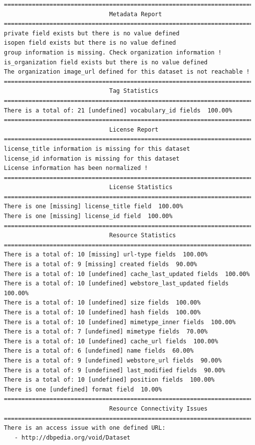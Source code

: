 \documentclass[runningheads,a4paper]{llncs}
\begin{document}
\begin{lstlisting}
=======================================================================
                              Metadata Report
=======================================================================
private field exists but there is no value defined
isopen field exists but there is no value defined
group information is missing. Check organization information !
is_organization field exists but there is no value defined
The organization image_url defined for this dataset is not reachable !
=======================================================================
                              Tag Statistics
=======================================================================
There is a total of: 21 [undefined] vocabulary_id fields  100.00%
=======================================================================
                              License Report
=======================================================================
license_title information is missing for this dataset
license_id information is missing for this dataset
License information has been normalized !
=======================================================================
                              License Statistics
=======================================================================
There is one [missing] license_title field  100.00%
There is one [missing] license_id field  100.00%
=======================================================================
                              Resource Statistics
=======================================================================
There is a total of: 10 [missing] url-type fields  100.00%
There is a total of: 9 [missing] created fields  90.00%
There is a total of: 10 [undefined] cache_last_updated fields  100.00%
There is a total of: 10 [undefined] webstore_last_updated fields  100.00%
There is a total of: 10 [undefined] size fields  100.00%
There is a total of: 10 [undefined] hash fields  100.00%
There is a total of: 10 [undefined] mimetype_inner fields  100.00%
There is a total of: 7 [undefined] mimetype fields  70.00%
There is a total of: 10 [undefined] cache_url fields  100.00%
There is a total of: 6 [undefined] name fields  60.00%
There is a total of: 9 [undefined] webstore_url fields  90.00%
There is a total of: 9 [undefined] last_modified fields  90.00%
There is a total of: 10 [undefined] position fields  100.00%
There is one [undefined] format field  10.00%
=======================================================================
                              Resource Connectivity Issues
=======================================================================
There is an access issue with one defined URL:
   - http://dbpedia.org/void/Dataset
\end{lstlisting}
\end{document}
